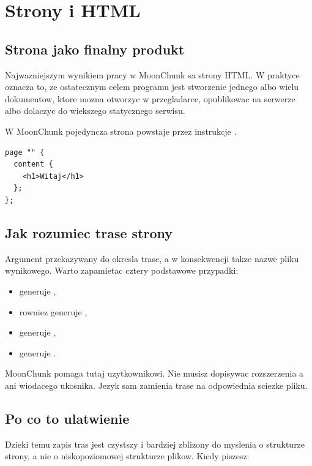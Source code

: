 \chapter{Strony i HTML}

\section{Strona jako finalny produkt}
Najwazniejszym wynikiem pracy w MoonChunk sa strony HTML. W praktyce oznacza to,
ze ostatecznym celem programu jest stworzenie jednego albo wielu dokumentow, ktore
mozna otworzyc w przegladarce, opublikowac na serwerze albo dolaczyc do wiekszego
statycznego serwisu.

W MoonChunk pojedyncza strona powstaje przez instrukcje .

\begin{lstlisting}[style=moonchunk,caption={Najprostsza strona}]
page "" {
  content {
    <h1>Witaj</h1>
  };
};
\end{lstlisting}

\section{Jak rozumiec trase strony}
Argument przekazywany do  okresla trase, a w konsekwencji takze nazwe pliku
wynikowego. Warto zapamietac cztery podstawowe przypadki:

\begin{itemize}
  \item {} generuje ,
  \item {} rowniez generuje ,
  \item {} generuje ,
  \item {} generuje .
\end{itemize}

MoonChunk pomaga tutaj uzytkownikowi. Nie musisz dopisywac rozszerzenia 
a ani wiodacego ukosnika. Jezyk sam zamienia trase na odpowiednia sciezke pliku.

\section{Po co to ulatwienie}
Dzieki temu zapis tras jest czystszy i bardziej zblizony do myslenia o strukturze strony,
a nie o niskopoziomowej strukturze plikow. Kiedy piszesz:

